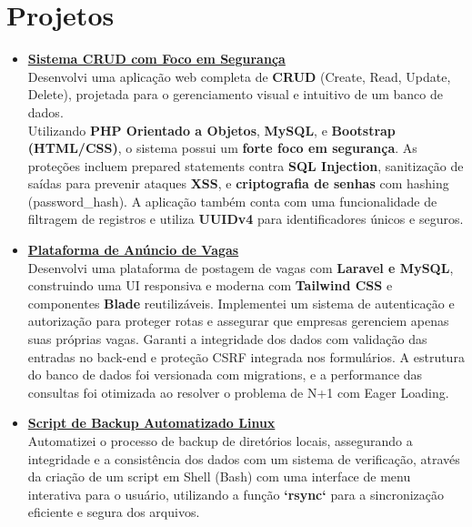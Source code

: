 \documentclass[a4paper,12pt]{article}
\begin{document}
\section*{Projetos}
\begin{itemize}[noitemsep, nolistsep, leftmargin=*, itemsep=8pt]
    \item 
        \href{https://github.com/nicolas-mendes/CRUD_PHP}{\textbf{Sistema CRUD com Foco em Segurança}} \\ 
Desenvolvi uma aplicação web completa de \textbf{CRUD} (Create, Read, Update, Delete), projetada para o gerenciamento visual e intuitivo de um banco de dados. \\
Utilizando \textbf{PHP Orientado a Objetos}, \textbf{MySQL}, e \textbf{Bootstrap (HTML/CSS)}, o sistema possui um \textbf{forte foco em segurança}. As proteções incluem prepared statements contra \textbf{SQL Injection}, sanitização de saídas para prevenir ataques \textbf{XSS}, e \textbf{criptografia de senhas} com hashing (password\_hash). A aplicação também conta com uma funcionalidade de filtragem de registros e utiliza \textbf{UUIDv4}  para identificadores únicos e seguros.

    \item 
        \href{https://github.com/nicolas-mendes/JobSprout}{\textbf{Plataforma de Anúncio de Vagas}} \\
Desenvolvi uma plataforma de postagem de vagas com \textbf{Laravel e MySQL}, construindo uma UI responsiva e moderna com \textbf{Tailwind CSS} e componentes \textbf{Blade} reutilizáveis. Implementei um sistema de autenticação e autorização para proteger rotas e assegurar que empresas gerenciem apenas suas próprias vagas. Garanti a integridade dos dados com validação das entradas no back-end e proteção CSRF integrada nos formulários. A estrutura do banco de dados foi versionada com migrations, e a performance das consultas foi otimizada ao resolver o problema de N+1 com Eager Loading.

    \item 
        \href{https://github.com/nicolas-mendes/script-backup-linux}{\textbf{Script de Backup Automatizado Linux}} \\
        Automatizei o processo de backup de diretórios locais, assegurando a integridade e a consistência dos dados com um sistema de verificação, através da criação de um script em Shell (Bash) com uma interface de menu interativa para o usuário, utilizando a função \textbf{`rsync`} para a sincronização eficiente e segura dos arquivos.
        
\end{itemize}
\end{document}
